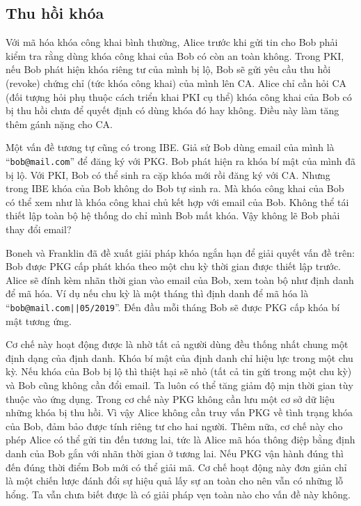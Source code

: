 \documentclass[class=report, crop=false]{standalone}
\begin{document}
		\subsection{Thu hồi khóa}\label{chap2:sec5:key_revocation}
			Với mã hóa khóa công khai bình thường, Alice trước khi gửi tin cho Bob phải kiểm tra rằng dùng khóa công khai của Bob có còn an toàn không. Trong PKI, nếu Bob phát hiện khóa riêng tư của mình bị lộ, Bob sẽ gửi yêu cầu thu hồi (revoke) chứng chỉ (tức khóa công khai) của mình lên CA. Alice chỉ cần hỏi CA (đối tượng hỏi phụ thuộc cách triển khai PKI cụ thể) khóa công khai của Bob có bị thu hồi chưa để quyết định có dùng khóa đó hay không. Điều này làm tăng thêm gánh nặng cho CA.

			Một vấn đề tương tự cũng có trong IBE. Giả sử Bob dùng email của mình là ``\texttt{bob@mail.com}'' để đăng ký với PKG. Bob phát hiện ra khóa bí mật của mình đã bị lộ. Với PKI, Bob có thể sinh ra cặp khóa mới rồi đăng ký với CA. Nhưng trong IBE khóa của Bob không do Bob tự sinh ra. Mà khóa công khai của Bob có thể xem như là khóa công khai chủ kết hợp với email của Bob. Không thể tái thiết lập toàn bộ hệ thống do chỉ mình Bob mất khóa. Vậy không lẽ Bob phải thay đổi email?

			Boneh và Franklin \cite{DBLP:conf/crypto/BonehF01} đã đề xuất giải pháp khóa ngắn hạn để giải quyết vấn đề trên: Bob được PKG cấp phát khóa theo một chu kỳ thời gian được thiết lập trước. Alice sẽ đính kèm nhãn thời gian vào email của Bob, xem toàn bộ như định danh để mã hóa. Ví dụ nếu chu kỳ là một tháng thì định danh để mã hóa là ``\texttt{bob@mail.com||05/2019}''. Đến đầu mỗi tháng Bob sẽ được PKG cấp khóa bí mật tương ứng.
			
			Cơ chế này hoạt động được là nhờ tất cả người dùng đều thống nhất chung một định dạng của định danh. Khóa bí mật của định danh chỉ hiệu lực trong một chu kỳ. Nếu khóa của Bob bị lộ thì thiệt hại sẽ nhỏ (tất cả tin gửi trong một chu kỳ) và Bob cũng không cần đổi email. Ta luôn có thể tăng giảm độ mịn thời gian tùy thuộc vào ứng dụng. Trong cơ chế này PKG không cần lưu một cơ sở dữ liệu những khóa bị thu hồi. Vì vậy Alice không cần truy vấn PKG về tình trạng khóa của Bob, đảm bảo được tính riêng tư cho hai người. Thêm nữa, cơ chế này cho phép Alice có thể gửi tin đến tương lai, tức là Alice mã hóa thông điệp bằng định danh của Bob gắn với nhãn thời gian ở tương lai. Nếu PKG vận hành đúng thì đến đúng thời điểm Bob mới có thể giải mã. Cơ chế hoạt động này đơn giản chỉ là một chiến lược đánh đổi sự hiệu quả lấy sự an toàn cho nên vẫn có những lỗ hổng. Ta vẫn chưa biết được là có giải pháp vẹn toàn nào cho vấn đề này không.
\end{document}
